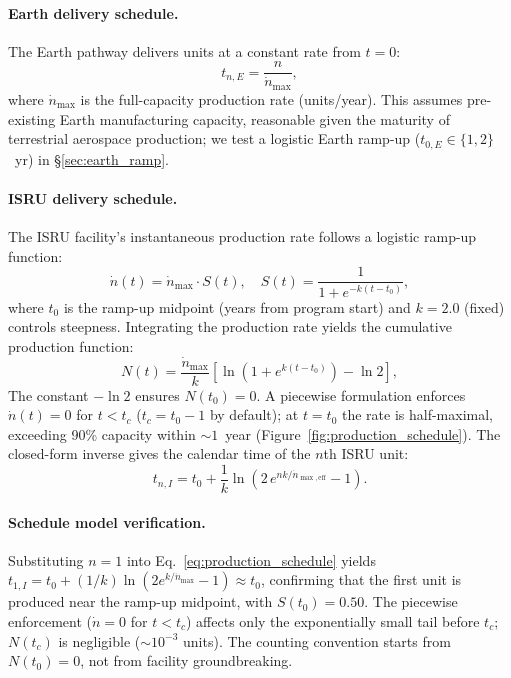 \documentclass[preprint,12pt]{elsarticle}
\begin{document}
\paragraph{Earth delivery schedule.} The Earth pathway delivers units at a constant rate from $t = 0$:
\begin{equation}
  t_{n,E} = \frac{n}{\dot{n}_{\max}},
  \label{eq:earth_schedule}
\end{equation}
where $\dot{n}_{\max}$ is the full-capacity production rate (units/year). This assumes pre-existing Earth manufacturing capacity, reasonable given the maturity of terrestrial aerospace production; we test a logistic Earth ramp-up ($t_{0,E} \in \{1, 2\}$~yr) in \S\ref{sec:earth_ramp}.

\paragraph{ISRU delivery schedule.} The ISRU facility's instantaneous production rate follows a logistic ramp-up function:
\begin{equation}
  \dot{n}(t) = \dot{n}_{\max} \cdot S(t), \quad S(t) = \frac{1}{1 + e^{-k(t - t_0)}},
  \label{eq:scurve}
\end{equation}
where $t_0$ is the ramp-up midpoint (years from program start) and $k = 2.0$ (fixed) controls steepness. Integrating the production rate yields the cumulative production function:
\begin{equation}
  N(t) = \frac{\dot{n}_{\max}}{k} \left[ \ln\!\left(1 + e^{k(t - t_0)}\right) - \ln 2 \right],
  \label{eq:cumulative_production}
\end{equation}
The constant $-\ln 2$ ensures $N(t_0) = 0$. A piecewise formulation enforces $\dot{n}(t) = 0$ for $t < t_c$ ($t_c = t_0 - 1$ by default); at $t = t_0$ the rate is half-maximal, exceeding 90\% capacity within ${\sim}1$~year (Figure~\ref{fig:production_schedule}). The closed-form inverse gives the calendar time of the $n$th ISRU unit:
\begin{equation}
  t_{n,I} = t_0 + \frac{1}{k} \ln\!\left(2\,e^{nk/\dot{n}_{\max,\mathrm{eff}}} - 1\right).
  \label{eq:production_schedule}
\end{equation}
\paragraph{Schedule model verification.} Substituting $n = 1$ into Eq.~\ref{eq:production_schedule} yields $t_{1,I} = t_0 + (1/k)\ln(2e^{k/\dot{n}_{\max}} - 1) \approx t_0$, confirming that the first unit is produced near the ramp-up midpoint, with $S(t_0) = 0.50$. The piecewise enforcement ($\dot{n} = 0$ for $t < t_c$) affects only the exponentially small tail before $t_c$; $N(t_c)$ is negligible (${\sim}10^{-3}$ units). The counting convention starts from $N(t_0) = 0$, not from facility groundbreaking.
\end{document}

